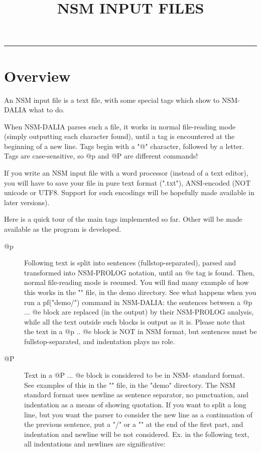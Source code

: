 \documentclass[11pt]{article}
\title{NSM INPUT FILES}
\begin{document}
\maketitle
\hrule

\section{Overview}

An NSM input file is a text file, with some special tags which show to
NSM-DALIA what to do.

When NSM-DALIA parses such a file, it works in normal file-reading
mode (simply outputting each character found), until a tag is
encountered at the beginning of a new line. Tags begin with a "@"
character, followed by a letter. Tags are case-sensitive, so @p and @P
are different commands!

If you write an NSM input file with a word processor (instead of a
text editor), you will have to save your file in pure text format
(".txt"), ANSI-encoded (NOT unicode or UTF8. Support for such
encodings will be hopefully made available in later versions).

Here is a quick tour of the main tags implemented so far. Other will
be made available as the program is developed.

\begin{description}
    \item[@p] 
Following text is split into sentences (fullstop-separated), parsed
and transformed into NSM-PROLOG notation, until an @e tag is
found. Then, normal file-reading mode is resumed. You will find many
example of how this works in the "" file, in the demo
directory. See what happens when you run a pf("demo/")
command in NSM-DALIA: the sentences between a @p ... @e block are
replaced (in the output) by their NSM-PROLOG analysis, while all the
text outside such blocks is output as it is. Please note that the text
in a @p .. @e block is NOT in NSM format, but sentences must be
fullstop-separated, and indentation plays no role.
    \item[@P] 
Text in a @P ... @e block is considered to be in NSM- standard
format. See examples of this in the "" file, in the "demo"
directory. The NSM standard format uses newline as sentence separator,
no punctuation, and indentation as a means of showing quotation. If
you want to split a long line, but you want the parser to consider the
new line as a continuation of the previous sentence, put a "/" or a
"\Sneg{}" at the end of the first part, and indentation and newline will be
not considered. Ex. in the following text, all indentations and
newlines are significative:
\end{description}
\end{document}
